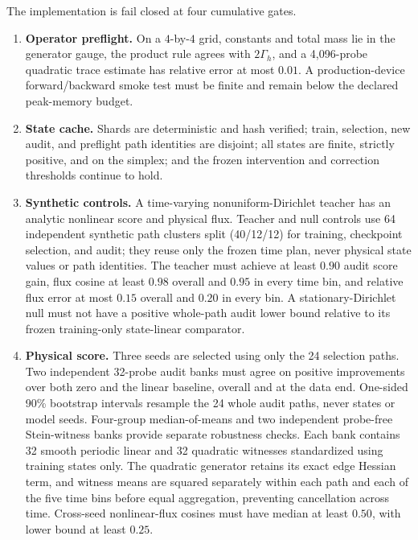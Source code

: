 \documentclass[11pt]{article}
\numberwithin{equation}{section}
\newcommand{\1}{\mathbf 1}
\begin{document}
The implementation is fail closed at four cumulative gates.
\begin{enumerate}[leftmargin=2.0em]
  \item \textbf{Operator preflight.}  On a \(4\)-by-\(4\) grid, constants and
  total mass lie in the generator gauge, the product rule agrees with
  \(2\Gamma_h\), and a 4,096-probe quadratic trace estimate has relative error
  at most \(0.01\).  A production-device forward/backward smoke test must be
  finite and remain below the declared peak-memory budget.
  \item \textbf{State cache.}  Shards are deterministic and hash verified;
  train, selection, new audit, and preflight path identities are disjoint; all
  states are finite, strictly positive, and on the simplex; and the frozen
  intervention and correction thresholds continue to hold.
  \item \textbf{Synthetic controls.}  A time-varying nonuniform-Dirichlet
  teacher has an analytic nonlinear score and physical flux.  Teacher and null
  controls use 64 independent synthetic path clusters split (40/12/12) for
  training, checkpoint selection, and audit; they reuse only the frozen time
  plan, never physical state values or path identities.  The teacher must achieve
  at least \(0.90\) audit score gain, flux cosine at least \(0.98\) overall and
  \(0.95\) in every time bin, and relative flux error at most \(0.15\) overall
  and \(0.20\) in every bin.  A stationary-Dirichlet null must not have a
  positive whole-path audit lower bound relative to its frozen training-only
  state-linear comparator.
  \item \textbf{Physical score.}  Three seeds are selected using only the 24
  selection paths.  Two independent 32-probe audit banks must agree on positive
  improvements over both zero and the linear baseline, overall and at the data
  end.  One-sided 90\% bootstrap intervals resample the 24 whole audit paths,
  never states or model seeds.  Four-group median-of-means and two independent
  probe-free Stein-witness banks provide separate robustness checks.  Each bank
  contains 32 smooth periodic linear and 32 quadratic witnesses standardized
  using training states only.  The quadratic generator retains its exact edge
  Hessian term, and witness means are squared separately within each path and
  each of the five time bins before equal aggregation, preventing cancellation
  across time.  Cross-seed nonlinear-flux cosines must have median at least \(0.50\),
  with lower bound at least \(0.25\).
\end{enumerate}
\end{document}
